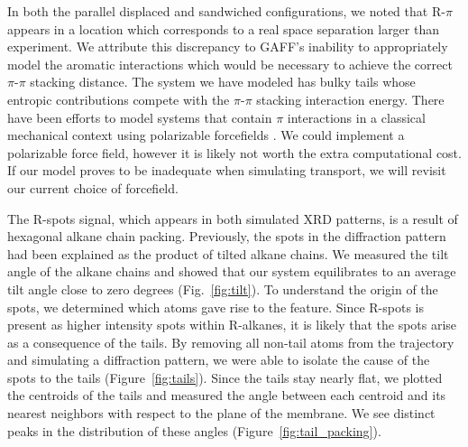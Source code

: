 \documentclass{article}
\begin{document}

  In both the parallel displaced and sandwiched configurations, we noted that
  R-$\pi$ appears in a location which corresponds to a real space separation
  larger than experiment. We attribute this discrepancy to GAFF's inability to
  appropriately model the aromatic interactions which would be necessary to
  achieve the correct $\pi$-$\pi$ stacking distance. 
  The system we have modeled has bulky tails whose entropic contributions compete
  with the $\pi$-$\pi$ stacking interaction energy.  There have been efforts to
  model systems that contain $\pi$ interactions in a classical mechanical context
  using polarizable forcefields \cite{baker_polarizable_2015}.  We could
  implement a polarizable force field, however it is likely not worth the extra
  computational cost. If our model proves to be inadequate when simulating
  transport, we will revisit our current choice of forcefield.  

  The R-spots signal, which appears in both simulated XRD patterns, is a result
  of hexagonal alkane chain packing. Previously, the spots in the diffraction
  pattern had been explained as the product of tilted alkane chains. We measured
  the tilt angle of the alkane chains and showed that our system equilibrates to
  an average tilt angle close to zero degrees (Fig.~\ref{fig:tilt}). To
  understand the origin of the spots, we determined which atoms gave rise to the
  feature. Since R-spots is present as higher intensity spots within R-alkanes,
  it is likely that the spots arise as a consequence of the tails. By removing
  all non-tail atoms from the trajectory and simulating a diffraction pattern, we
  were able to isolate the cause of the spots to the tails
  (Figure~\ref{fig:tails}). Since the tails stay nearly flat, we plotted the
  centroids of the tails and measured the angle between each centroid and its
  nearest neighbors with respect to the plane of the membrane. We see distinct
  peaks in the distribution of these angles (Figure~\ref{fig:tail_packing}).
\end{document}
